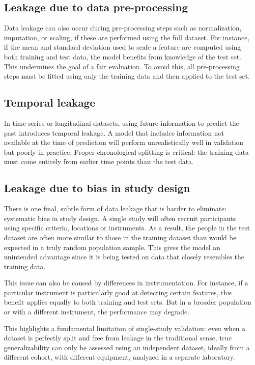 \documentclass[letterpaper, 12pt]{article}
\begin{document}
\subsection*{Leakage due to data pre-processing}

Data leakage can also occur during pre-processing steps such as normalization, imputation, or scaling, if these are performed using the full dataset. For instance, if the mean and standard deviation used to scale a feature are computed using both training and test data, the model benefits from knowledge of the test set. This undermines the goal of a fair evaluation. To avoid this, all pre-processing steps must be fitted using only the training data and then applied to the test set.

\subsection*{Temporal leakage}

In time series or longitudinal datasets, using future information to predict the past introduces temporal leakage. A model that includes information not available at the time of prediction will perform unrealistically well in validation but poorly in practice. Proper chronological splitting is critical: the training data must come entirely from earlier time points than the test data.

\subsection*{Leakage due to bias in study design}

There is one final, subtle form of data leakage that is harder to eliminate: systematic bias in study design. A single study will often recruit participants using specific criteria, locations or instruments. As a result, the people in the test dataset are often more similar to those in the training dataset than would be expected in a truly random population sample. This gives the model an unintended advantage since it is being tested on data that closely resembles the training data.

This issue can also be caused by differences in instrumentation. For instance, if a particular instrument is particularly good at detecting certain features, this benefit applies equally to both training and test sets. But in a broader population or with a different instrument, the performance may degrade. 

This highlights a fundamental limitation of single-study validation: even when a dataset is perfectly split and free from leakage in the traditional sense, true generalizability can only be assessed using an independent dataset, ideally from a different cohort, with different equipment, analyzed in a separate laboratory.
\end{document}
